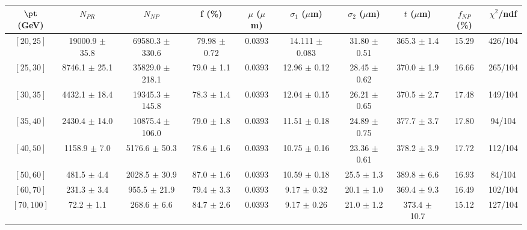 \begin{tabular}{c||c|c|c|c|c|c|c||c|c}
$\pt$ (GeV) & $N_{PR}$ & $N_{NP}$ & f (\%) & $\mu$ ($\mu$m) & $\sigma_1$ ($\mu$m) & $\sigma_2$ ($\mu$m)  & $t$ ($\mu$m) & $f_{NP}$ (\%) & $\chi^2$/ndf \\
\hline
$[20, 25]$ & 19000.9 $\pm$ 35.8 & 69580.3 $\pm$ 330.6 & 79.98 $\pm$ 0.72 & 0.0393 & 14.111 $\pm$ 0.083 & 31.80 $\pm$ 0.51 & 365.3 $\pm$ 1.4 & 15.29 & 426/104\\
$[25, 30]$ & 8746.1 $\pm$ 25.1 & 35829.0 $\pm$ 218.1 & 79.0 $\pm$ 1.1 & 0.0393 & 12.96 $\pm$ 0.12 & 28.45 $\pm$ 0.62 & 370.0 $\pm$ 1.9 & 16.66 & 265/104\\
$[30, 35]$ & 4432.1 $\pm$ 18.4 & 19345.3 $\pm$ 145.8 & 78.3 $\pm$ 1.4 & 0.0393 & 12.04 $\pm$ 0.15 & 26.21 $\pm$ 0.65 & 370.5 $\pm$ 2.7 & 17.48 & 149/104\\
$[35, 40]$ & 2430.4 $\pm$ 14.0 & 10875.4 $\pm$ 106.0 & 79.0 $\pm$ 1.8 & 0.0393 & 11.51 $\pm$ 0.18 & 24.89 $\pm$ 0.75 & 377.7 $\pm$ 3.7 & 17.80 & 94/104\\
$[40, 50]$ & 1158.9 $\pm$ 7.0 & 5176.6 $\pm$ 50.3 & 78.6 $\pm$ 1.6 & 0.0393 & 10.75 $\pm$ 0.16 & 23.36 $\pm$ 0.61 & 378.2 $\pm$ 3.9 & 17.72 & 112/104\\
$[50, 60]$ & 481.5 $\pm$ 4.4 & 2028.5 $\pm$ 30.9 & 87.0 $\pm$ 1.6 & 0.0393 & 10.59 $\pm$ 0.18 & 25.5 $\pm$ 1.3 & 389.8 $\pm$ 6.6 & 16.93 & 84/104\\
$[60, 70]$ & 231.3 $\pm$ 3.4 & 955.5 $\pm$ 21.9 & 79.4 $\pm$ 3.3 & 0.0393 & 9.17 $\pm$ 0.32 & 20.1 $\pm$ 1.0 & 369.4 $\pm$ 9.3 & 16.49 & 102/104\\
$[70, 100]$ & 72.2 $\pm$ 1.1 & 268.6 $\pm$ 6.6 & 84.7 $\pm$ 2.6 & 0.0393 & 9.17 $\pm$ 0.26 & 21.0 $\pm$ 1.2 & 373.4 $\pm$ 10.7 & 15.12 & 127/104\\
\end{tabular}
